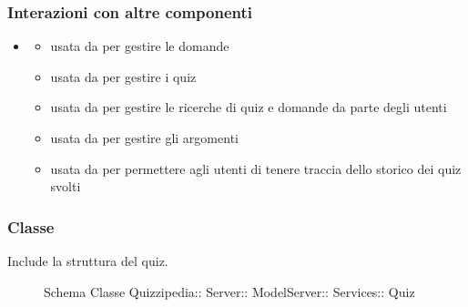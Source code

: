 \subsubsection{Interazioni con altre componenti}
\begin{itemize}
\item {}
\begin{itemize}
\item usata da  per gestire le domande
\item usata da  per gestire i quiz
\item usata da  per gestire le ricerche di quiz e domande da parte degli utenti
\item usata da  per gestire gli argomenti
\item usata da  per permettere agli utenti di tenere traccia dello storico dei quiz svolti
\end{itemize}
\end{itemize}
\subsubsection{Classe }
Include la struttura del quiz.
\begin{figure}[H]
\centering
\noindent{}
\caption[Schema Classe Quiz]{Schema Classe Quizzipedia:: Server:: ModelServer:: Services:: Quiz}
\end{figure}
